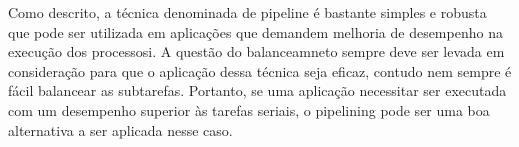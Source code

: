 Como descrito, a técnica denominada de pipeline é bastante simples e robusta que
pode ser utilizada em aplicações que demandem melhoria de desempenho na execução
dos processosi. A questão do balanceamneto sempre deve ser levada em
consideração para que o aplicação dessa técnica seja eficaz, contudo nem sempre
é fácil balancear as subtarefas. Portanto, se uma aplicação necessitar ser
executada com um desempenho superior às tarefas seriais, o pipelining pode ser
uma boa alternativa a ser aplicada nesse caso.

